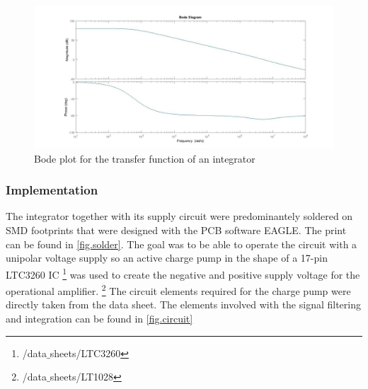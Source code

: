\begin{figure}[H]
\includegraphics[width=\textwidth]{figures/Method/integrator/transferfunction_int.jpg}
\caption[Kurze Abbildungsbeschreibung]{Bode plot for the transfer function of an integrator}
\label{fig.Bodeplot}
\end{figure}

\subsubsection{Implementation}
The integrator together with its supply circuit were predominantely soldered on SMD footprints that were designed
with the PCB software EAGLE. The print can be found in \ref{fig.solder}.
The goal was to be able to operate the circuit with a unipolar voltage supply so an active charge pump in the 
shape of a 17-pin LTC3260 IC \footnote{/data$\_$sheets/LTC3260} was used to create the negative and positive supply voltage for the operational amplifier.
\footnote{/data$\_$sheets/LT1028}
The circuit elements required for the charge pump were directly taken from the data sheet. The elements involved with the signal 
filtering and integration can be found in \ref{fig.circuit}
    
